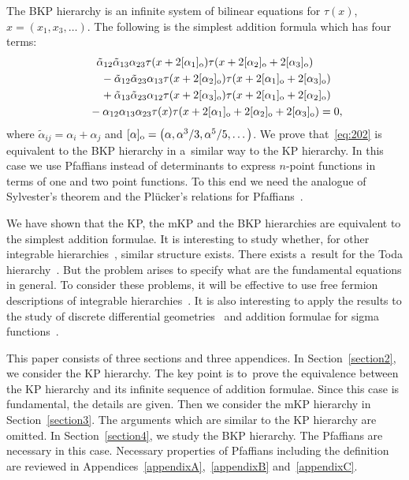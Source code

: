 \documentclass[pdftex]{sigma}
\begin{document}
The BKP hierarchy is an inf\/inite system of bilinear equations for $\tau(x)$, $x=(x_1,x_3,\dots)$.
The following is the simplest addition formula which has four terms:
\begin{gather}
\tilde{\alpha}_{12}\tilde{\alpha}_{13}\alpha_{23}
\tau(x+2[\alpha_1]_{\rm o})\tau(x+2[\alpha_2]_{\rm o}+2[\alpha_3]_{\rm o})
\nonumber
\\
\qquad
{}-\tilde{\alpha}_{12}\tilde{\alpha}_{23}\alpha_{13}
\tau(x+2[\alpha_2]_{\rm o})\tau(x+2[\alpha_1]_{\rm o}+2[\alpha_3]_{\rm o})\nonumber
\\
\qquad
{}+\tilde{\alpha}_{13}\tilde{\alpha}_{23}\alpha_{12}
\tau(x+2[\alpha_3]_{\rm o})\tau(x+2[\alpha_1]_{\rm o}+2[\alpha_2]_{\rm o})\nonumber
\\
\qquad
{}-\alpha_{12}\alpha_{13}\alpha_{23}\tau(x)\tau(x+2[\alpha_1]_{\rm o}+2[\alpha_2]_{\rm o}+2[\alpha_3]_{\rm o})=0,
\label{eq:202}
\end{gather}
where $\tilde{\alpha}_{ij}=\alpha_i+\alpha_j$ and $[\alpha]_{\rm o}=\big(\alpha,\alpha^3/3,\alpha^5/5,\dots\big)$.
We prove that~\eqref{eq:202} is equivalent to the BKP hierarchy in a~similar way to the KP hierarchy.
In this case we use Pfaf\/f\/ians instead of determinants to express $n$-point functions in terms of one
and two point functions.
To this end we need the analogue of Sylvester's theorem and the Pl\"{u}cker's relations for
Pfaf\/f\/ians~\cite{H2,O1}.

We have shown that the KP, the mKP and the BKP hierarchies are equivalent to the simplest addition formulae.
It is interesting to study whether, for other integrable hierarchies~\cite{DJM1-I,DJM1-II,DJM1-V,JM1,T1,T2}, similar
structure exists.
There exists a~result for the Toda hierarchy~\cite{T1,Te1}.
But the problem arises to specify what are the fundamental equations in general.
To consider these problems, it will be ef\/fective to use free fermion descriptions of integrable
hierarchies~\cite{DJM1-I,DJM1-II,DJM1-V,JM1}.
It is also interesting to apply the results to the study of discrete dif\/ferential
geometries~\cite{BS1, IKMO1} and addition formulae for sigma functions~\cite{BEL1,EEG1,N1}.

This paper consists of three sections and three appendices.
In Section~\ref{section2}, we consider the KP hierarchy.
The key point is to~prove the equivalence between the KP hierarchy and its inf\/inite sequence of
addition formulae.
Since this case is fundamental, the details are given.
Then we consider the mKP hierarchy in Section~\ref{section3}.
The arguments which are similar to the KP hierarchy are omitted.
In Section~\ref{section4}, we study the BKP hierarchy.
The Pfaf\/f\/ians are necessary in this case.
Necessary properties of Pfaf\/f\/ians including the def\/inition are reviewed in Appendices~\ref{appendixA},~\ref{appendixB} and~\ref{appendixC}.
\end{document}
